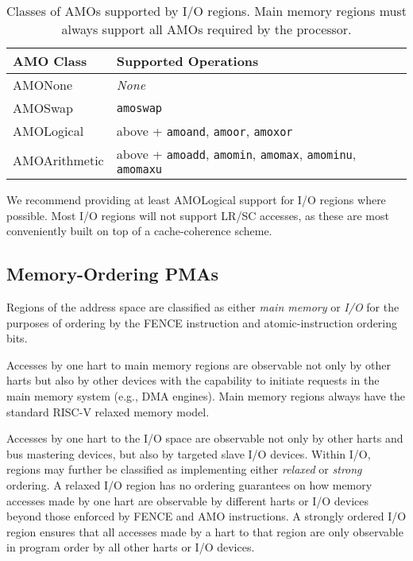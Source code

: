 \begin{table*}[h!]
\begin{center}
\begin{tabular}{|l|l|}
  \hline
  AMO Class & Supported Operations \\
  \hline
  AMONone       & {\em None} \\
  AMOSwap       & {\tt amoswap} \\
  AMOLogical    & above + {\tt amoand}, {\tt amoor}, {\tt amoxor} \\
  AMOArithmetic & above + {\tt amoadd}, {\tt amomin}, {\tt amomax}, {\tt amominu}, {\tt amomaxu} \\
  \hline
\end{tabular}
\end{center}
\caption{Classes of AMOs supported by I/O regions.  Main memory
  regions must always support all AMOs required by the processor.}
\label{amoclasses}
\end{table*}

\begin{commentary}
We recommend providing at least AMOLogical support for I/O regions
where possible.  Most I/O regions will not support LR/SC accesses, as
these are most conveniently built on top of a cache-coherence scheme.
\end{commentary}

\subsection{Memory-Ordering PMAs}

Regions of the address space are classified as either {\em main
  memory} or {\em I/O} for the purposes of ordering by the FENCE
instruction and atomic-instruction ordering bits.

Accesses by one hart to main memory regions are observable not only by
other harts but also by other devices with the capability to initiate
requests in the main memory system (e.g., DMA engines).  Main memory
regions always have the standard RISC-V relaxed memory model.

Accesses by one hart to the I/O space are observable not only by other
harts and bus mastering devices, but also by targeted slave I/O
devices.  Within I/O, regions may further be classified as
implementing either {\em relaxed} or {\em strong} ordering.  A relaxed
I/O region has no ordering guarantees on how memory accesses made by
one hart are observable by different harts or I/O devices beyond those
enforced by FENCE and AMO instructions.  A strongly ordered I/O region
ensures that all accesses made by a hart to that region are only
observable in program order by all other harts or I/O devices.

